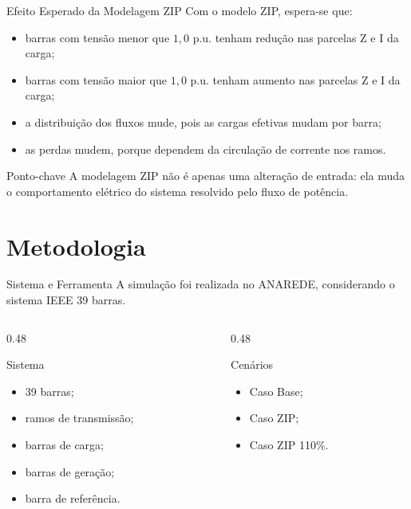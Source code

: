 \documentclass[aspectratio=169,11pt]{beamer}
\newcommand{\casobase}{Caso Base}
\newcommand{\casozip}{Caso ZIP}
\newcommand{\casozipcento}{Caso ZIP 110\%}
\newcommand{\pu}{p.u.}
\begin{document}
\begin{frame}{Efeito Esperado da Modelagem ZIP}
  Com o modelo ZIP, espera-se que:

  \begin{itemize}
    \item barras com tensão menor que $1{,}0$ \pu{} tenham redução nas parcelas Z e I da carga;
    \item barras com tensão maior que $1{,}0$ \pu{} tenham aumento nas parcelas Z e I da carga;
    \item a distribuição dos fluxos mude, pois as cargas efetivas mudam por barra;
    \item as perdas mudem, porque dependem da circulação de corrente nos ramos.
  \end{itemize}

  \begin{block}{Ponto-chave}
    A modelagem ZIP não é apenas uma alteração de entrada: ela muda o comportamento elétrico do sistema resolvido pelo fluxo de potência.
  \end{block}
\end{frame}

\section{Metodologia}

\begin{frame}{Sistema e Ferramenta}
  A simulação foi realizada no ANAREDE, considerando o sistema IEEE 39 barras.

  \begin{columns}[T]
    \begin{column}{0.48\textwidth}
      \begin{block}{Sistema}
        \begin{itemize}
          \item 39 barras;
          \item ramos de transmissão;
          \item barras de carga;
          \item barras de geração;
          \item barra de referência.
        \end{itemize}
      \end{block}
    \end{column}

    \begin{column}{0.48\textwidth}
      \begin{block}{Cenários}
        \begin{itemize}
          \item \casobase;
          \item \casozip;
          \item \casozipcento.
        \end{itemize}
      \end{block}
    \end{column}
  \end{columns}
\end{frame}
\end{document}
